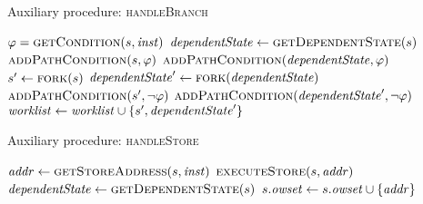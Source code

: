 \begin{algorithm}
  \caption{Auxiliary procedure: \textsc{handleBranch}
  \label{fig:aux-func-recS}}
\begin{algorithmic}[1]

 \label{alg:branch-check-recovery}
  \State $\varphi = \Call{getCondition}{\workstate, \inst}$  \label{alg:branch-get-cond}
  \State $\dependentState \gets  \Call{getDependentState}{\workstate}$ \label{alg:get-dependent}
   \label{alg:branch-feasible-true}
    \State $\Call{addPathCondition}{\workstate, \varphi}$ \label{alg:add-pc-true-recS}
    \State $\Call{addPathCondition}{\dependentState, \varphi}$ \label{alg:add-pc-true-depS}
  \EndIf
   \label{alg:branch-feasible-false}
    \State $\workstate' \gets \Call{fork}{\workstate}$ \label{alg:branch-fork-false1}
    \State $\dependentState' \gets \Call{fork}{\dependentState}$ \label{alg:branch-fork-false2}
    \State $\Call{addPathCondition}{\workstate', \neg \varphi}$ \label{alg:add-pc-false-recS}
    \State $\Call{addPathCondition}{\dependentState', \neg \varphi}$ \label{alg:add-pc-false-depS}
    \State $\mathit{worklist} \gets \mathit{worklist} \cup \{s', \mathit{dependentState}'\}$ \label{alg:push-both}
  \EndIf
\Else
  \State {}  \label{alg:branch-normal}
\EndIf
\EndFunction
\end{algorithmic}
\end{algorithm}

\begin{algorithm}
  \caption{Auxiliary procedure: \textsc{handleStore}
  \label{fig:aux-func-recS}}
\begin{algorithmic}[1]

\State $\addr \gets \Call{getStoreAddress}{\workstate, \inst}$
\State $\Call{executeStore}{\workstate,\addr}$ \label{alg:store-normal}
 \label{alg:store-check-recovery}
  \State $\dependentState \gets \Call{getDependentState}{\workstate}$
  \State {} \label{alg:store-udpate-dep-states}
\Else
  \State $s.\mathit{owset} \gets s.\mathit{owset} \cup \{\mathit{addr}\}$ \label{alg:record-overwrite}
\EndIf
\EndFunction
\end{algorithmic}
\end{algorithm}

